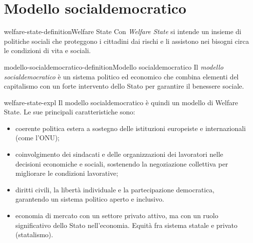 \documentclass[preview]{standalone}
\begin{document}
\genpage

\section{Modello socialdemocratico}

\begin{snippetdefinition}{welfare-state-definition}{Welfare State}
    Con \textit{Welfare State} si intende un insieme di politiche sociali
    che proteggono i cittadini dai rischi e li assistono nei bisogni circa le condizioni di vita e sociali.
\end{snippetdefinition}

\begin{snippetdefinition}{modello-socialdemocratico-definition}{Modello socialdemocratico}
    Il \textit{modello socialdemocratico} è un sistema politico ed economico che combina elementi del capitalismo con un forte intervento dello Stato per garantire il benessere sociale.
\end{snippetdefinition}

\begin{snippet}{welfare-state-expl}
    Il modello socialdemocratico è quindi un modello di Welfare State.
    Le sue principali caratteristiche sono:
    \begin{itemize}
        \item coerente politica estera a sostegno delle istituzioni europeiste e internazionali (come l'ONU);
        \item coinvolgimento dei sindacati e delle organizzazioni dei lavoratori nelle decisioni economiche e sociali, sostenendo la negoziazione collettiva per migliorare le condizioni lavorative;
        \item diritti civili, la libertà individuale e la partecipazione democratica, garantendo un sistema politico aperto e inclusivo.
        \item economia di mercato con un settore privato attivo, ma con un ruolo significativo dello Stato nell'economia.
            Equità fra sistema statale e privato (statalismo).
    \end{itemize}
\end{snippet}
\end{document}
